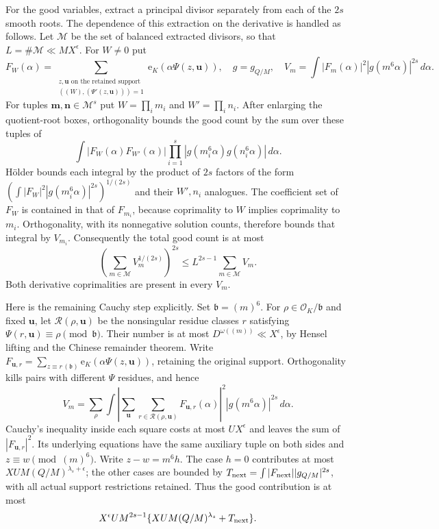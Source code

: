 \documentclass[11pt,reqno]{amsart}
\numberwithin{equation}{section}
\theoremstyle{definition}
\begin{document}
For the good variables, extract a principal divisor separately from each of the
$2s$ smooth roots.  The dependence of this extraction on the derivative is
handled as follows.  Let $\mathcal M$ be the set of balanced extracted divisors,
so that $L=\#\mathcal M\ll MX^\epsilon$.  For $W\ne0$ put
\[
 F_W(\alpha)=\sum_{\substack{z,\mathbf u\text{ on the retained support}\\
              ((W),(\Psi'(z,\mathbf u)))=1}}
       \mathrm e_K(\alpha\Psi(z,\mathbf u)),
 \quad g=g_{Q/M},\quad
 V_m=\int|F_m(\alpha)|^2|g(m^6\alpha)|^{2s}\,d\alpha.
\]
For tuples $\mathbf m,\mathbf n\in\mathcal M^s$ put
$W=\prod_i m_i$ and $W'=\prod_i n_i$.
After enlarging the quotient-root boxes, orthogonality bounds the good count by
the sum over these tuples of
\[
 \int |F_W(\alpha)F_{W'}(\alpha)|
       \prod_{i=1}^s|g(m_i^6\alpha)g(n_i^6\alpha)|\,d\alpha.
\]
H\"older bounds each integral by the product of $2s$ factors of the form
$(\int|F_W|^2|g(m_i^6\alpha)|^{2s})^{1/(2s)}$ and their $W',n_i$ analogues.
The coefficient set of $F_W$ is contained in that of $F_{m_i}$, because
coprimality to $W$ implies coprimality to $m_i$.  Orthogonality, with its
nonnegative solution counts, therefore bounds that integral by $V_{m_i}$.
Consequently the total good count is at most
\[
 \left(\sum_{m\in\mathcal M}V_m^{1/(2s)}\right)^{2s}
 \le L^{2s-1}\sum_{m\in\mathcal M}V_m.
\]
Both derivative coprimalities are present in every $V_m$.

Here is the remaining Cauchy step explicitly.  Set $\mathfrak b=(m)^6$.
For $\rho\in\mathcal O_K/\mathfrak b$ and fixed $\mathbf u$, let
$\mathcal R(\rho,\mathbf u)$ be the nonsingular residue classes $r$ satisfying
$\Psi(r,\mathbf u)\equiv\rho\pmod{\mathfrak b}$.
Their number is at most $D^{\omega((m))}\ll X^\epsilon$, by Hensel lifting
and the Chinese remainder theorem.  Write
$F_{\mathbf u,r}=\sum_{z\equiv r\, (\mathfrak b)}
\mathrm e_K(\alpha\Psi(z,\mathbf u))$, retaining the original support.
Orthogonality kills pairs with different $\Psi$ residues, and hence
\[
 V_m=\sum_\rho\int
 \left|\sum_{\mathbf u}\sum_{r\in\mathcal R(\rho,\mathbf u)}
                   F_{\mathbf u,r}(\alpha)\right|^2
 |g(m^6\alpha)|^{2s}\,d\alpha.
\]
Cauchy's inequality inside each square costs at most $UX^\epsilon$ and leaves
the sum of $|F_{\mathbf u,r}|^2$.  Its underlying equations have the same
auxiliary tuple on both sides and $z\equiv w\pmod{(m)^6}$.
Write $z-w=m^6h$.  The case $h=0$ contributes at most
$XUM(Q/M)^{\lambda_s+\epsilon}$; the other cases are bounded by
$T_{\rm next}=\int|F_{\rm next}||g_{Q/M}|^{2s}$, with all actual support
restrictions retained.  Thus the good contribution is at most
\[
 X^\epsilon U M^{2s-1}
 \{XUM(Q/M)^{\lambda_s}+T_{\rm next}\}.
\]
\end{document}
